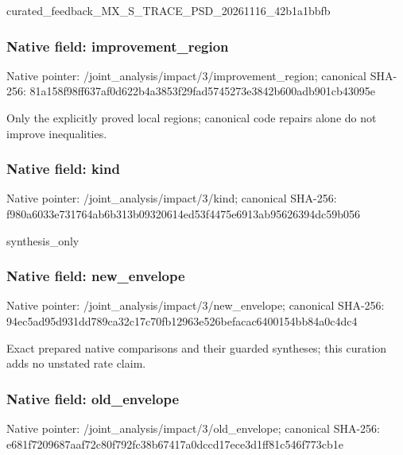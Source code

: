 \documentclass[10pt,a4paper]{article}
\begin{document}
\begingroup\raggedright\sloppy curated\_\allowbreak{}feedback\_\allowbreak{}MX\_\allowbreak{}S\_\allowbreak{}TRACE\_\allowbreak{}PSD\_\allowbreak{}20261116\_\allowbreak{}42b1a1bbfb\par\endgroup

\subsubsection{Native field: improvement\_\allowbreak{}region}
Native pointer: /joint\_\allowbreak{}analysis/impact/3/improvement\_\allowbreak{}region; canonical SHA-256: 81a158f98ff637af0d622b4a3853f29fad5745273e3842b600adb901cb43095e

\begingroup\raggedright\sloppy Only the explicitly proved local regions;\allowbreak{} canonical code repairs alone do not improve inequalities.\par\endgroup

\subsubsection{Native field: kind}
Native pointer: /joint\_\allowbreak{}analysis/impact/3/kind; canonical SHA-256: f980a6033e731764ab6b313b09320614ed53f4475e6913ab95626394dc59b056

\begingroup\raggedright\sloppy synthesis\_\allowbreak{}only\par\endgroup

\subsubsection{Native field: new\_\allowbreak{}envelope}
Native pointer: /joint\_\allowbreak{}analysis/impact/3/new\_\allowbreak{}envelope; canonical SHA-256: 94ec5ad95d931dd789ca32c17c70fb12963e526befacac6400154bb84a0c4dc4

\begingroup\raggedright\sloppy Exact prepared native comparisons and their guarded syntheses;\allowbreak{} this curation adds no unstated rate claim.\par\endgroup

\subsubsection{Native field: old\_\allowbreak{}envelope}
Native pointer: /joint\_\allowbreak{}analysis/impact/3/old\_\allowbreak{}envelope; canonical SHA-256: e681f7209687aaf72c80f792fc38b67417a0dccd17ece3d1ff81c546f773cb1e
\end{document}

